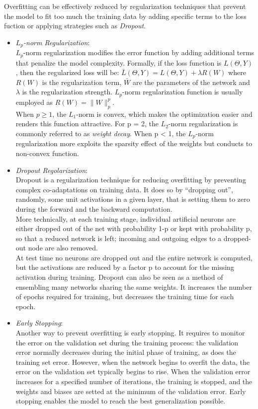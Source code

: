  Overfitting can be eﬀectively reduced by regularization techniques that prevent the model to fit too much the training data by adding specific terms to the loss fuction or applying strategies such as \emph{Dropout}.
 
 \begin{itemize}
 	\item \emph{$L_p$-norm Regularization}:\\
 	$L_p$-norm regularization modiﬁes the error function by adding additional terms that penalize the model complexity. Formally, if the loss function is $L(\Theta,Y)$, then the regularized loss will be: $\bar{L}(\Theta,Y) =L(\Theta,Y) + \lambda R(W)$ where $R(W)$ is the regularization term, $\bar{W}$ are the parameters of the network and $\lambda$ is the regularization strength. $L_p$-norm regularization function is usually employed as $R(W)=\parallel W\parallel^p_p$.\\
 	 When $p ≥ 1$, the $L_1$-norm is convex, which makes the optimization easier and renders this function attractive. For p = 2, the $L_2$-norm regularization is commonly referred to as \emph{weight decay}. When p < 1, the $L_p$-norm regularization more exploits the sparsity eﬀect of the weights but conducts to non-convex function.
 	{}\\
 	\item \emph{Dropout Regolarization}:\\
 	Dropout is a regularization technique for reducing overfitting by preventing complex co-adaptations on training data.
 	It does so by “dropping out”, randomly, some unit activations in a given layer, that is setting them to zero during the forward and the backward computation.\\
 	More technically, at each training stage, individual artificial neurons are either dropped out of the net with probability 1-p or kept with probability p, so that a reduced network is left; incoming and outgoing edges to a dropped-out node are also removed.\\
 	At test time no neurons are dropped out and the entire network is computed, but the activations are reduced by a factor p to account for the missing activation during training.
 	Dropout can also be seen as a method of ensembling many networks sharing the same weights.
 	It increases the number of epochs required for training, but decreases the training time for each epoch.
 	{}\\
 	\item \emph{Early Stopping}:\\
 	Another way to prevent overfitting is early stopping. 
 	It requires to monitor the error on the validation set during the training process: the validation error normally decreases during the initial phase of training, as does the training set error. However, when the network begins to overfit the data, the error on the validation set typically begins to rise. When the validation error increases for a specified number of iterations, the training is stopped, and the weights and biases are setted at the minimum of the validation error.
 	Early stopping enables the model to reach the best generalization possible.
 	 	 
 \end{itemize}

